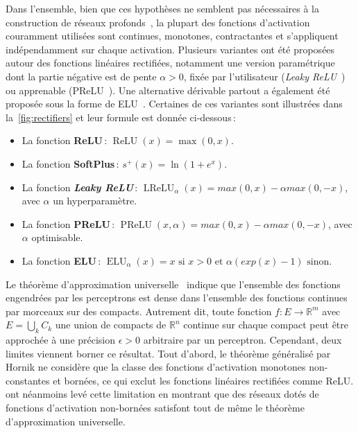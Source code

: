 Dans l'ensemble, bien que ces hypothèses ne semblent pas nécessaires à la construction de réseaux profonds~\cite{oyallon_building_2017}, la plupart des fonctions d'activation couramment utilisées sont continues, monotones, contractantes et s'appliquent indépendamment sur chaque activation. Plusieurs variantes ont été proposées autour des fonctions linéaires rectifiées, notamment une version paramétrique dont la partie négative est de pente $\alpha > 0$, fixée par l'utilisateur (\emph{Leaky ReLU}~\cite{maas_rectifier_2013}) ou apprenable (\gls{PReLU}~\cite{he_delving_2015}). Une alternative dérivable partout a également été proposée sous la forme de \gls{ELU}~\cite{clevert_fast_2015}.
Certaines de ces variantes sont illustrées dans la~\cref{fig:rectifiers} et leur formule est donnée ci-dessous\,:
\begin{itemize}
  \item La fonction \textbf{\gls{ReLU}}\,: $\operatorname{ReLU}(x) = \max(0,x)$.
  \item La fonction \textbf{SoftPlus}\,: $s^+(x) = \ln(1 + e^x)$.
  \item La fonction \textbf{\emph{Leaky ReLU}}\,: $\operatorname{LReLU}_\alpha(x) = max(0,x) - \alpha max(0,-x)$, avec $\alpha$ un hyperparamètre.
  \item La fonction \textbf{\gls{PReLU}}\,: $\operatorname{PReLU}(x, \alpha) = max(0,x) - \alpha max(0,-x)$, avec $\alpha$ optimisable.
  \item La fonction \textbf{\gls{ELU}}\,: $\operatorname{ELU}_\alpha(x) = x \text{ si } x > 0 \text{ et } \alpha (exp(x) - 1) \text{ sinon}$.
\end{itemize}

Le théorème d'approximation universelle~\cite{cybenko_approximation_1989,hornik_approximation_1991} indique que l'ensemble des fonctions engendrées par les perceptrons est dense dans l'ensemble des fonctions continues par morceaux sur des compacts. Autrement dit, toute fonction $f : E \rightarrow \mathbb{R}^m$ avec $E = \bigcup_k C_k$ une union de compacts de $\mathbb{R}^n$ continue sur chaque compact peut être approchée à une précision $\epsilon > 0$ arbitraire par un perceptron. Cependant, deux limites viennent borner ce résultat. Tout d'abord, le théorème généralisé par Hornik ne considère que la classe des fonctions d'activation monotones non-constantes et bornées, ce qui exclut les fonctions linéaires rectifiées comme \gls{ReLU}. \citet{sonoda_neural_2017} ont néanmoins levé cette limitation en montrant que des réseaux dotés de fonctions d'activation non-bornées satisfont tout de même le théorème d'approximation universelle.

